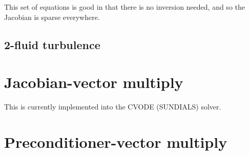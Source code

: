 \documentclass[12pt]{article}
\begin{document}
This set of equations is good in that there is no inversion needed,
and so the Jacobian is sparse everywhere.

\subsection{2-fluid turbulence}


\section{Jacobian-vector multiply}

This is currently implemented into the CVODE (SUNDIALS) solver.

\section{Preconditioner-vector multiply}
\end{document}
